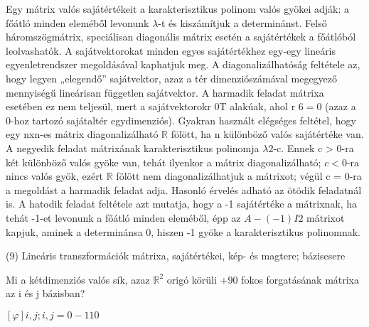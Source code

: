 \begin{frame}
  \begin{tcolorbox}[title={8/6. -Q-}]
     Egy mátrix valós sajátértékeit a karakterisztikus polinom valós gyökei adják: a főátló minden eleméből levonunk ${\lambda}$-t és kiszámítjuk a determinánst. Felső háromszögmátrix, speciálisan diagonális mátrix esetén a sajátértékek a főátlóból leolvashatók. A sajátvektorokat minden egyes sajátértékhez egy-egy lineáris egyenletrendszer megoldásával kaphatjuk meg. A diagonalizálhatóság feltétele az, hogy legyen „elegendő” sajátvektor, azaz a tér dimenziószámával megegyező mennyiségű lineárisan független sajátvektor. A harmadik feladat mátrixa esetében ez nem teljesül, mert a sajátvektorokr 0T alakúak, ahol r $6= 0$ (azaz a 0-hoz tartozó sajátaltér egydimenziós). Gyakran használt elégséges feltétel, hogy egy nxn-es mátrix diagonalizálható $\mathbb{R}$ fölött, ha n különböző valós sajátértéke van. A negyedik feladat mátrixának karakterisztikus polinomja ${\lambda}2$-c. Ennek c > 0-ra két különböző valós gyöke van, tehát ilyenkor a mátrix diagonalizálható; $c < 0$-ra nincs valós gyök, ezért $\mathbb{R}$ fölött nem diagonalizálhatjuk a mátrixot; végül c = 0-ra a megoldást a harmadik feladat adja. Hasonló érvelés adható az ötödik feladatnál is. A hatodik feladat feltétele azt mutatja, hogy a -1 sajátértéke a mátrixnak, ha tehát -1-et levonunk a főátló minden eleméből, épp az $A-(-1)I2$ mátrixot kapjuk, aminek a determinánsa 0, hiszen -1 gyöke a karakterisztikus polinomnak.

  \end{tcolorbox}
\end{frame}



\begin{frame}[plain]
\begin{tcolorbox}[center, colback={myyellow}, coltext={black}, colframe={myyellow}]
    {\RHuge  (9) Lineáris transzformációk mátrixa, sajátértékei, kép- és magtere; báziscsere }
    \mmedskip
\end{tcolorbox}
\end{frame}

\begin{frame}
  \begin{tcolorbox}[title={9/1. -N-}]
    Mi a kétdimenziós valós sík, azaz $\mathbb{R}^2$ origó körüli $+90$ fokos forgatásának mátrixa az i és j bázisban?

  \tcblower

    \mmedskip 
    
    $[{\varphi}]i,j;i,j = 0 -1 1 0$
  \end{tcolorbox}
\end{frame}


